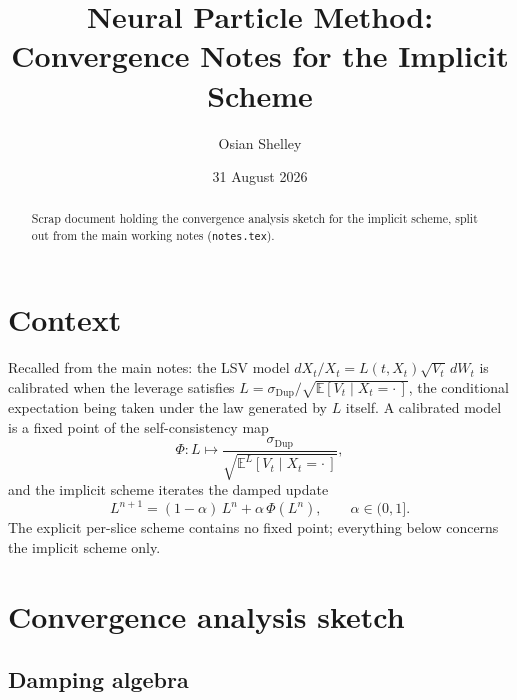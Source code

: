 \documentclass[11pt,a4paper]{article}
\title{Neural Particle Method: Convergence Notes for the Implicit Scheme}
\author{Osian Shelley}
\date{31 August 2026}
\theoremstyle{plain}
\theoremstyle{definition}
\theoremstyle{definition}
\newcommand{\E}{\mathbb{E}}
\newcommand{\sigDup}{\sigma_{\mathrm{Dup}}}
\newcommand{\Lev}{L}
\newcommand{\Phimap}{\Phi}
\begin{document}
\maketitle

\begin{abstract}
Scrap document holding the convergence analysis sketch for the implicit scheme, split out from the main working notes (\texttt{notes.tex}).
\end{abstract}

\section{Context}\label{sec:context}

Recalled from the main notes: the LSV model $dX_t/X_t = \Lev(t,X_t)\sqrt{V_t}\,dW_t$ is calibrated when the leverage satisfies $\Lev = \sigDup/\sqrt{\E[V_t \mid X_t = \cdot\,]}$, the conditional expectation being taken under the law generated by $\Lev$ itself. A calibrated model is a fixed point of the self-consistency map
\begin{equation}\label{eq:phimap}
  \Phimap\colon \Lev \longmapsto
  \frac{\sigDup}{\sqrt{\E^{\Lev}[V_t \mid X_t = \cdot\,]}},
\end{equation}
and the implicit scheme iterates the damped update
\begin{equation}\label{eq:damped}
  \Lev^{n+1} = (1 - \alpha)\,\Lev^{n} + \alpha\,\Phimap(\Lev^{n}),
  \qquad \alpha \in (0, 1].
\end{equation}
The explicit per-slice scheme contains no fixed point; everything below concerns the implicit scheme only.

\section{Convergence analysis sketch}\label{sec:theory}

\subsection{Damping algebra}
\end{document}
